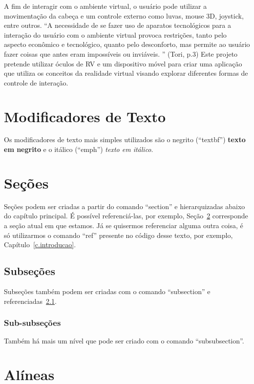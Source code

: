 A fim de interagir com o ambiente virtual, o usuário pode utilizar a movimentação da cabeça e um controle externo como luvas, mouse 3D, joystick, entre outros. “A necessidade de se fazer uso de aparatos tecnológicos para a interação do usuário com o ambiente virtual provoca restrições, tanto pelo aspecto econômico e tecnológico, quanto pelo desconforto, mas permite ao usuário fazer coisas que antes eram impossíveis ou inviáveis. ” (Tori, p.3)
Este projeto pretende utilizar óculos de RV e um dispositivo móvel para criar uma aplicação que utiliza os conceitos da realidade virtual visando explorar diferentes formas de controle de interação.

\section{Modificadores de Texto}
\label{s.modificador}

Os modificadores de texto mais simples utilizados são o negrito (``textbf'') \textbf{texto em negrito} e o itálico (``emph'') \emph{texto em itálico}.

\section{Seções}
\label{s.citacoes}

Seções podem ser criadas a partir do comando ``section'' e hierarquizadas abaixo do capítulo principal. É possível referenciá-las, por exemplo, Seção~\ref{s.citacoes} corresponde a seção atual em que estamos. Já se quisermos referenciar alguma outra coisa, é só utilizarmos o comando ``ref'' presente no código desse texto, por exemplo, Capítulo~\ref{c.introducao}.

\subsection{Subseções}
\label{ss.subsecao}

Subseções também podem ser criadas com o comando ``subsection'' e referenciadas~\ref{ss.subsecao}.

\subsubsection{Sub-subseções}
\label{sss.subsubsecao}

Também há mais um nível que pode ser criado com o comando ``subsubsection''.

\section{Alíneas}
\label{s.alineas}

